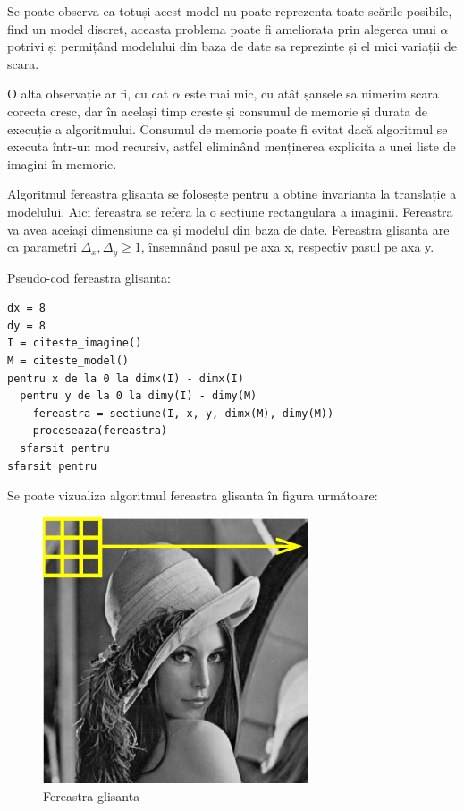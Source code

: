 Se poate observa ca totuși acest model nu poate reprezenta toate scările posibile, find un model discret, aceasta problema poate fi ameliorata prin alegerea unui ${\alpha}$ potrivi și permițând modelului din baza de date sa reprezinte și el mici variații de scara.

O alta observație ar fi, cu cat ${\alpha}$ este mai mic, cu atât șansele sa nimerim scara corecta cresc, dar în același timp creste și consumul de memorie și durata de execuție a algoritmului. Consumul de memorie poate fi evitat dacă algoritmul se executa într-un mod recursiv, astfel eliminând menținerea explicita a unei liste de imagini în memorie.

Algoritmul fereastra glisanta se folosește pentru a obține invarianta la translație a modelului.
Aici fereastra se refera la o secțiune rectangulara a imaginii.
Fereastra va avea aceiași dimensiune ca și modelul din baza de date.
Fereastra glisanta are ca parametri ${\Delta_x, \Delta_y \geq 1}$, însemnând pasul pe axa x, respectiv pasul pe axa y.

Pseudo-cod fereastra glisanta:
\begin{mdframed}
\begin{verbatim}
dx = 8
dy = 8
I = citeste_imagine()
M = citeste_model()
pentru x de la 0 la dimx(I) - dimx(I)
  pentru y de la 0 la dimy(I) - dimy(M)
    fereastra = sectiune(I, x, y, dimx(M), dimy(M))
    proceseaza(fereastra)
  sfarsit pentru
sfarsit pentru
\end{verbatim}
\end{mdframed}

Se poate vizualiza algoritmul fereastra glisanta în figura următoare:
\begin{figure}[H]
	\centering
		\includegraphics[width=0.70\textwidth]{imagini/AGhannoum-SlidingWindow.png}
	\caption{Fereastra glisanta}
	\label{fig:AGhannoum-SlidingWindow}
\end{figure}


